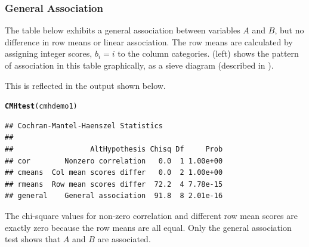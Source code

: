 \documentclass[11pt]{book}\usepackage[]{graphicx}\usepackage[]{color}
\makeatletter
\newcommand{\hlstd}[1]{\textcolor[rgb]{0.345,0.345,0.345}{#1}}%
\newcommand{\hlkwd}[1]{\textcolor[rgb]{0.737,0.353,0.396}{\textbf{#1}}}%
\newenvironment{kframe}{%
 \def\at@end@of@kframe{}%
 \ifinner\ifhmode%
  \def\at@end@of@kframe{\end{minipage}}%
  \begin{minipage}{\columnwidth}%
 \fi\fi%
 \def\FrameCommand##1{\hskip\@totalleftmargin \hskip-\fboxsep
 \colorbox{shadecolor}{##1}\hskip-\fboxsep
     \hskip-\linewidth \hskip-\@totalleftmargin \hskip\columnwidth}%
 \MakeFramed {\advance\hsize-\width
   \@totalleftmargin\z@ \linewidth\hsize
   \@setminipage}}%
 {\par\unskip\endMakeFramed%
 \at@end@of@kframe}
\newenvironment{knitrout}{}{} %
\renewenvironment{knitrout}{\small\renewcommand{\baselinestretch}{.85}}{} %
\makeatother
\begin{document}
\subsubsection{General Association}
The table below exhibits a
general association between variables $A$ and $B$, but no difference in
row means or linear association.  The row means are calculated by
assigning integer scores, $b_i = i$ to the column categories.
(left) shows
the pattern of association in this table graphically, as a sieve diagram
(described in ).





This is reflected in the  output shown below.
\begin{knitrout}
\color{fgcolor}\begin{kframe}
\begin{alltt}
\hlkwd{CMHtest}\hlstd{(cmhdemo1)}
\end{alltt}
\begin{verbatim}
## Cochran-Mantel-Haenszel Statistics 
## 
##                  AltHypothesis Chisq Df     Prob
## cor        Nonzero correlation   0.0  1 1.00e+00
## cmeans  Col mean scores differ   0.0  2 1.00e+00
## rmeans  Row mean scores differ  72.2  4 7.78e-15
## general    General association  91.8  8 2.01e-16
\end{verbatim}
\end{kframe}
\end{knitrout}


The chi-square values for non-zero correlation and different
row mean scores are exactly zero because the row means are all equal.
Only the general association test shows that $A$ and $B$
are associated.
\end{document}
